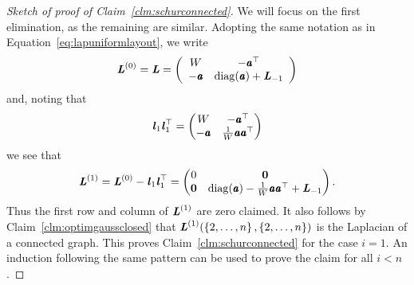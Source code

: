\begin{proof}[Sketch of proof of Claim~\ref{clm:schurconnected}]
We will focus on the first elimination, as the remaining are similar.
Adopting the same notation as in Equation~\eqref{eq:lapuniformlayout},
we write
 \[
\boldsymbol{\mathit{L}}^{(0)} = \boldsymbol{\mathit{L}}  =
\left(
\begin{array}{ccc}
W & -\pmb{\mathit{a}}^\top \\
-\pmb{\mathit{a}}& \operatorname*{diag}(\pmb{\mathit{a}}) + \boldsymbol{\mathit{L}}_{-1}
\end{array} \right)
\]
and, noting that
\[
  \boldsymbol{\mathit{l}}_1 \boldsymbol{\mathit{l}}_1^{\top} =
  \begin{pmatrix}
   W & -\pmb{\mathit{a}}^\top \\
-\pmb{\mathit{a}} & \frac{1}{W} \pmb{\mathit{a}} \pmb{\mathit{a}}^{\top}
\end{pmatrix}
\]
we see that
\[
  \boldsymbol{\mathit{L}}^{(1)}  = \boldsymbol{\mathit{L}}^{(0)} - \boldsymbol{\mathit{l}}_1 \boldsymbol{\mathit{l}}_1^{\top} =
  \begin{pmatrix}
   0 & \boldsymbol{0} \\
\boldsymbol{0} & \operatorname*{diag}(\pmb{\mathit{a}}) - \frac{1}{W} \pmb{\mathit{a}} \pmb{\mathit{a}}^{\top}  + \boldsymbol{\mathit{L}}_{-1}
\end{pmatrix}
.
\]
Thus the first row and column of $\boldsymbol{\mathit{L}}^{(1)}$ are zero claimed.
It also follows by Claim~\ref{clm:optimgaussclosed} that
$\boldsymbol{\mathit{L}}^{(1)}(\left\{2,\ldots,n \right\}, \left\{2,\ldots,n \right\})$ is the
Laplacian of a connected graph.
This proves Claim~\ref{clm:schurconnected} for the case $i = 1$.
An induction following the same pattern can be used to prove the claim
for all $i < n$.
\end{proof}














